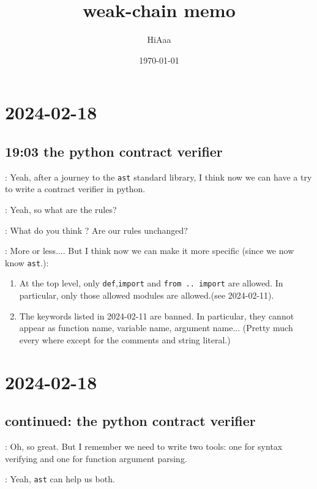 \documentclass[dvipsnames]{article}
\title{weak-chain memo}
\date{\today}
\author{HiAaa}
\begin{document}
\maketitle
\tableofcontents{}
\newpage{}

% 
% 
% 

\section*{2024-02-18}
\subsection*{19:03 the python contract verifier}

 : Yeah, after a journey to the \texttt{ast} standard library, I
think now we can have a try to write a contract verifier in python.

 : Yeah, so what are the rules?

 : What do you think ? Are our rules unchanged?

 : More or less.... But I think now we can make it more
specific (since we now know \texttt{ast}.):

\begin{enumerate}
\item At the top level, only \texttt{def},\texttt{import} and \texttt{from .. import}
  are allowed. In particular, only those allowed modules are allowed.(see
  2024-02-11).
\item The keywords listed in 2024-02-11 are banned. In particular, they cannot
  appear as function name, variable name, argument name... (Pretty much every
  where except for the comments and string literal.)
\end{enumerate}

\section*{2024-02-18}
\subsection*{continued: the python contract verifier}
 : Oh, so great. But I remember we need to write two tools: one
for syntax verifying and one for function argument parsing.

 : Yeah, \texttt{ast} can help us both.
\end{document}
